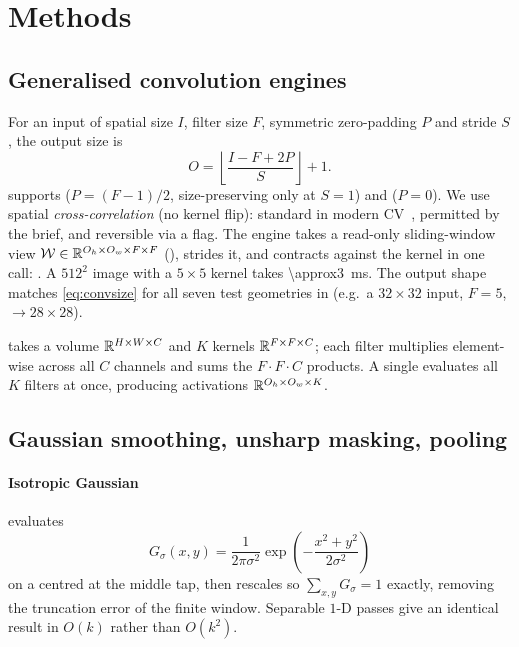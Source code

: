 \section{Methods}
\label{sec:methods}

\subsection{Generalised convolution engines}
\label{sec:conv}

For an input of spatial size $I$, filter size $F$, symmetric zero-padding $P$
and stride $S$, the output size is
\begin{equation}
  O = \left\lfloor \frac{I - F + 2P}{S} \right\rfloor + 1 .
  \label{eq:convsize}
\end{equation}
 supports 
($P=(F-1)/2$, size-preserving only at $S=1$) and  ($P=0$). We use
spatial \emph{cross-correlation} (no kernel flip): standard in modern
CV~\cite{szeliski2022}, permitted by the brief, and reversible via a
 flag. The engine takes a read-only sliding-window view
$\mathcal{W}\in\mathbb{R}^{O_h\times O_w\times F\times F}$
(), strides it, and contracts against the kernel in
one call: . A $512^2$ image with a $5\times5$
kernel takes \SI{\approx3}{\milli\second}. The output shape matches
\cref{eq:convsize} for all seven test geometries in
 (e.g.\ a $32\times32$ input, $F=5$,
 $\rightarrow 28\times28$).

 takes a volume $\mathbb{R}^{H\times W\times C}$ and $K$ kernels
$\mathbb{R}^{F\times F\times C}$; each filter multiplies element-wise across all $C$
channels and sums the $F\!\cdot\!F\!\cdot\!C$ products. A single
 evaluates all $K$ filters at once,
producing activations $\mathbb{R}^{O_h\times O_w\times K}$.

\subsection{Gaussian smoothing, unsharp masking, pooling}
\label{sec:enh}

\paragraph{Isotropic Gaussian}
 evaluates
\begin{equation}
  G_\sigma(x,y)=\frac{1}{2\pi\sigma^2}\exp\!\left(-\frac{x^2+y^2}{2\sigma^2}\right)
  \label{eq:gauss}
\end{equation}
on a  centred at the middle tap, then rescales so
$\sum_{x,y}G_\sigma=1$ exactly, removing the truncation error of the finite
window. Separable $1$-D passes give an identical result in $O(k)$ rather than
$O(k^2)$.

